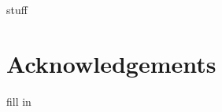 \documentclass[review]{elsarticle}
\begin{document}
 

\newpage
stuff
% 

\section*{Acknowledgements}

fill in

\newpage
\section*{\refname}

\end{document}
